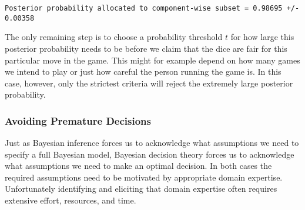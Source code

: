 \documentclass[
  letterpaper,
  DIV=11,
  numbers=noendperiod]{scrartcl}
\newenvironment{Shaded}{\begin{snugshade}}{\end{snugshade}}
\newcommand{\ControlFlowTok}[1]{\textcolor[rgb]{0.00,0.23,0.31}{#1}}
\newcommand{\DecValTok}[1]{\textcolor[rgb]{0.68,0.00,0.00}{#1}}
\newcommand{\FunctionTok}[1]{\textcolor[rgb]{0.28,0.35,0.67}{#1}}
\newcommand{\NormalTok}[1]{\textcolor[rgb]{0.00,0.23,0.31}{#1}}
\newcommand{\OtherTok}[1]{\textcolor[rgb]{0.00,0.23,0.31}{#1}}
\newcommand{\SpecialCharTok}[1]{\textcolor[rgb]{0.37,0.37,0.37}{#1}}
\newcommand{\StringTok}[1]{\textcolor[rgb]{0.13,0.47,0.30}{#1}}
\begin{document}
\begin{Shaded}
\end{Shaded}

\begin{verbatim}
Posterior probability allocated to component-wise subset = 0.98695 +/- 0.00358
\end{verbatim}

The only remaining step is to choose a probability threshold \(t\) for
how large this posterior probability needs to be before we claim that
the dice are fair for this particular move in the game. This might for
example depend on how many games we intend to play or just how careful
the person running the game is. In this case, however, only the
strictest criteria will reject the extremely large posterior
probability.

\subsubsection{Avoiding Premature
Decisions}\label{avoiding-premature-decisions}

Just as Bayesian inference forces us to acknowledge what assumptions we
need to specify a full Bayesian model, Bayesian decision theory forces
us to acknowledge what assumptions we need to make an optimal decision.
In both cases the required assumptions need to be motivated by
appropriate domain expertise. Unfortunately identifying and eliciting
that domain expertise often requires extensive effort, resources, and
time.
\end{document}
